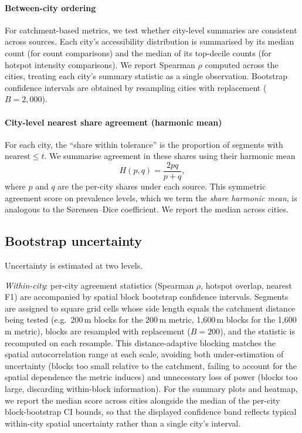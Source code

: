 \paragraph{Between-city ordering} For catchment-based metrics, we test whether city-level summaries are consistent across sources. Each city's accessibility distribution is summarised by its median count (for count comparisons) and the median of its top-decile counts (for hotspot intensity comparisons). We report Spearman $\rho$ computed across the \NRefCities{} cities, treating each city's summary statistic as a single observation. Bootstrap confidence intervals are obtained by resampling cities with replacement ($B=2{,}000$).

\paragraph{City-level nearest share agreement (harmonic mean)} For each city, the ``share within tolerance'' is the proportion of segments with $\mathrm{nearest} \leq t$. We summarise agreement in these shares using their harmonic mean
\[
  H(p,q)=\frac{2pq}{p+q},
\]
where $p$ and $q$ are the per-city shares under each source. This symmetric agreement score on prevalence levels, which we term the \emph{share harmonic mean}, is analogous to the S{\o}rensen--Dice coefficient. We report the median across cities.

\subsection{Bootstrap uncertainty}
\label{sec:poi-supp-bootstrap}

Uncertainty is estimated at two levels.

\emph{Within-city}: per-city agreement statistics (Spearman $\rho$, hotspot overlap, nearest F1) are accompanied by spatial block bootstrap confidence intervals. Segments are assigned to square grid cells whose side length equals the catchment distance being tested (e.g.\ 200\,m blocks for the 200\,m metric, 1{,}600\,m blocks for the 1{,}600\,m metric), blocks are resampled with replacement ($B=200$), and the statistic is recomputed on each resample. This distance-adaptive blocking matches the spatial autocorrelation range at each scale, avoiding both under-estimation of uncertainty (blocks too small relative to the catchment, failing to account for the spatial dependence the metric induces) and unnecessary loss of power (blocks too large, discarding within-block information). For the summary plots and heatmap, we report the median score across cities alongside the median of the per-city block-bootstrap CI bounds, so that the displayed confidence band reflects typical within-city spatial uncertainty rather than a single city's interval.

